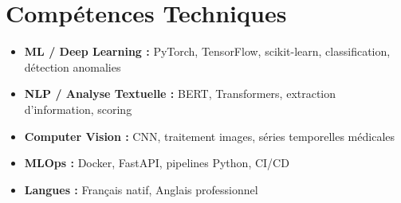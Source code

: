 \documentclass[a4paper,11pt]{article}
\begin{document}
\section{Comp\'etences Techniques}
\begin{itemize}[leftmargin=0.5cm, nosep]
    \item \textbf{ML / Deep Learning :} PyTorch, TensorFlow, scikit-learn, classification, d\'etection anomalies
    \item \textbf{NLP / Analyse Textuelle :} BERT, Transformers, extraction d'information, scoring
    \item \textbf{Computer Vision :} CNN, traitement images, s\'eries temporelles m\'edicales
    \item \textbf{MLOps :} Docker, FastAPI, pipelines Python, CI/CD
    \item \textbf{Langues :} Fran\c{c}ais natif, Anglais professionnel
\end{itemize}
\end{document}
